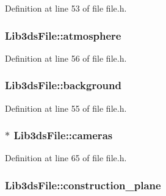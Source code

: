 Definition at line 53 of file file.\-h.

\hypertarget{struct_lib3ds_file_aff7a7078862a6dbe8d1fcdece96348c1}{
\subsubsection[{atmosphere}]{ Lib3ds\-File\-::atmosphere}}\label{struct_lib3ds_file_aff7a7078862a6dbe8d1fcdece96348c1}


Definition at line 56 of file file.\-h.

\hypertarget{struct_lib3ds_file_a8a8e773869b9aa42d84660ed93c180ee}{
\subsubsection[{background}]{ Lib3ds\-File\-::background}}\label{struct_lib3ds_file_a8a8e773869b9aa42d84660ed93c180ee}


Definition at line 55 of file file.\-h.

\hypertarget{struct_lib3ds_file_abca35d2771d9ea1dd3eac7feb212651b}{
\subsubsection[{cameras}]{$\ast$ Lib3ds\-File\-::cameras}}\label{struct_lib3ds_file_abca35d2771d9ea1dd3eac7feb212651b}


Definition at line 65 of file file.\-h.

\hypertarget{struct_lib3ds_file_a980c8806e318d5bab3e6e012471ba6a0}{
\subsubsection[{construction\-\_\-plane}]{ Lib3ds\-File\-::construction\-\_\-plane}}\label{struct_lib3ds_file_a980c8806e318d5bab3e6e012471ba6a0}


